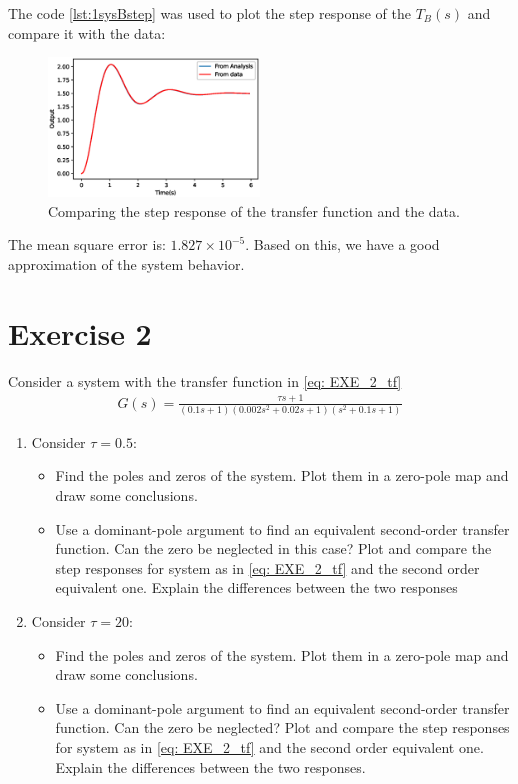 \documentclass[a4paper]{article}
\begin{document}
The code \ref{lst:1sysBstep} was used to plot the step response of the $T_B(s)$ and compare it with the data:
\begin{figure}[H]
    \centering
    \includegraphics[width=0.5\textwidth]{Figures/Question1/EXE_1_COMPARE_SYS_B.eps}
    \caption{Comparing the step response of the transfer function and the data.}
    \label{fig: MSE_B}
\end{figure}

The mean square error is: $1.827\times10^{-5}$. Based on this, we have a good approximation of the system behavior.
\section*{Exercise 2} 
Consider a system with the transfer function in \eqref{eq: EXE_2_tf}
\begin{align}
	\label{eq: EXE_2_tf}
    G(s) =\frac{\tau s + 1}{(0.1s+1)(0.002s^2+0.02s+1)(s^2+0.1s+1)}
\end{align}
\begin{enumerate}
    	   \item Consider $\tau = 0.5$:
        \begin{itemize}
            \item Find the poles and zeros of the system. Plot them in a zero-pole map and draw some conclusions.
            \item Use a dominant-pole argument to find an equivalent second-order transfer function. Can the zero be neglected in this case? Plot and compare 
            the step responses for system as in \ref{eq: EXE_2_tf} and the second order equivalent one. Explain the differences between the two responses
        \end{itemize}
   		\item Consider $\tau=20$:
    \begin{itemize}
        \item Find the poles and zeros of the system. Plot them in a zero-pole map and draw some conclusions.
        \item Use a dominant-pole argument to find an equivalent second-order transfer function. Can the zero be neglected? Plot and compare the step 
        responses for system as in \ref{eq: EXE_2_tf} and the second order equivalent one. Explain the differences between the two responses.
    \end{itemize}
\end{enumerate}
\end{document}
